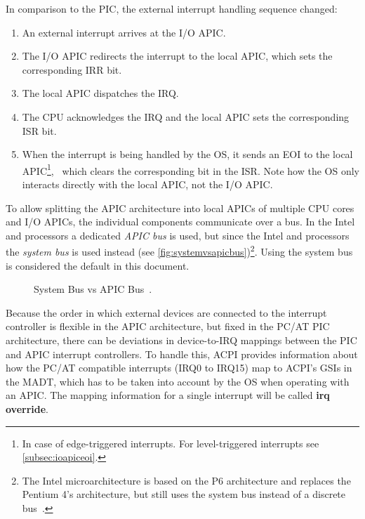 In comparison to the PIC, the external interrupt handling sequence changed:

\begin{enumerate}
  \item An external interrupt arrives at the I/O APIC\@.
  \item The I/O APIC redirects the interrupt to the local APIC, which sets the corresponding IRR bit.
  \item The local APIC dispatches the IRQ\@.
  \item The CPU acknowledges the IRQ and the local APIC sets the corresponding ISR bit.
  \item When the interrupt is being handled by the OS, it sends an EOI to the local APIC\footnote{
          In case of edge-triggered interrupts. For level-triggered interrupts see \autoref{subsec:ioapiceoi}.},
        \ which clears the corresponding bit in the ISR\@.
        Note how the OS only interacts directly with the local APIC, not the I/O APIC\@.
\end{enumerate}

To allow splitting the APIC architecture into local APICs of multiple CPU cores and I/O APICs, the individual components communicate over a bus.
In the Intel  and  processors a dedicated \textit{APIC bus} is used, but since the Intel  and  processors the \textit{system bus} is used instead (see \autoref{fig:systemvsapicbus})\footnote{
  The Intel  microarchitecture is based on the P6 architecture and replaces the Pentium 4's  architecture, but still uses the system bus instead of a discrete bus~\autocite[sec.~3.11.2]{ia32}.}.
Using the system bus is considered the default in this document.

\begin{figure}[h]
  \centering
  \begin{subfigure}[b]{0.6\textwidth}
    
  \end{subfigure}
  \caption{System Bus vs APIC Bus~\autocite[sec.~3.11.1]{ia32}.}
  \label{fig:systemvsapicbus}
\end{figure}

Because the order in which external devices are connected to the interrupt controller is flexible in the APIC architecture, but fixed in the PC/AT PIC architecture, there can be deviations in device-to-IRQ mappings between the PIC and APIC interrupt controllers.
To handle this, ACPI provides information about how the PC/AT compatible interrupts (IRQ0 to IRQ15) map to ACPI's GSIs in the MADT, which has to be taken into account by the OS when operating with an APIC\@.
The mapping information for a single interrupt will be called \textbf{\gls{irq override}}.

